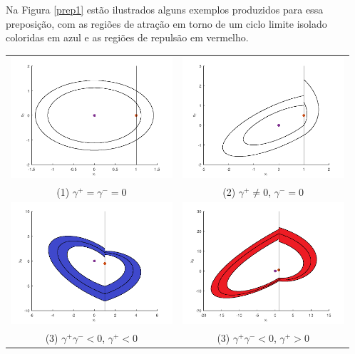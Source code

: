 Na Figura \ref{prep1} estão ilustrados alguns exemplos produzidos para essa preposição, com as regiões de atração em torno de um ciclo limite isolado coloridas em azul e as regiões de repulsão em vermelho.
\begin{table}[H]
\centering
\begin{tabular}{cc}
\includegraphics[width=6cm]{1_1}
&
\includegraphics[width=6cm]{1_2}\\
\small(1) $\gamma^+=\gamma^-=0$&\small(2) $\gamma^+\neq0$, $\gamma^-=0$\\
\includegraphics[width=6cm]{1_3_1}
&
\includegraphics[width=6cm]{1_3_2}\\
\small(3) $\gamma^+\gamma^-<0$, $\gamma^+<0$&\small(3) $\gamma^+\gamma^-<0$, $\gamma^+>0$\\

\end{tabular}
\end{table}
